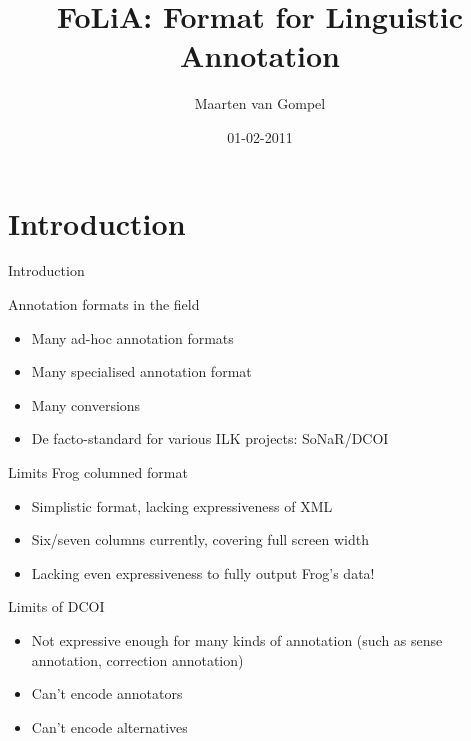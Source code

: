 \documentclass[compress]{beamer}
\title{FoLiA: Format for Linguistic Annotation}
\author{Maarten van Gompel}
\date{01-02-2011}
\begin{document}
\begin{frame}
	\titlepage\smallraccoon\ilkuvt
\end{frame}

\section{Introduction}

\begin{frame}{Introduction}

    \begin{block}{Annotation formats in the field}
        \begin{itemize}
            \item Many ad-hoc annotation formats
            \item Many specialised annotation format
            \item Many conversions
            \item De facto-standard for various ILK projects: SoNaR/DCOI
        \end{itemize}
    \end{block}
    
    \begin{block}{Limits Frog columned format}
        \begin{itemize}
            \item Simplistic format, lacking expressiveness of XML
            \item Six/seven columns currently, covering full screen width
            \item Lacking even expressiveness to fully output Frog's data!
        \end{itemize}
    \end{block}

    \begin{block}{Limits of DCOI}
        \begin{itemize}
            \item Not expressive enough for many kinds of annotation (such as sense annotation, correction annotation)
            \item Can't encode annotators
            \item Can't encode alternatives
        \end{itemize}
    \end{block}

\end{frame}
\end{document}
